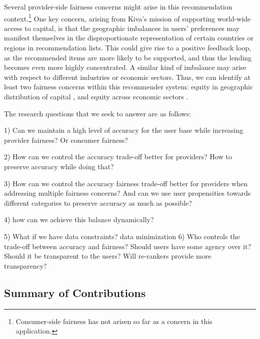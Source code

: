 Several provider-side fairness concerns might arise in this recommendation context.\footnote{Consumer-side fairness has not arisen so far as a concern in this application.} One key concern, arising from Kiva's mission of supporting world-wide access to capital, is that the geographic imbalances in users' preferences may manifest themselves in the disproportionate representation of certain countries or regions in recommendation lists. This could give rise to a positive feedback loop, as the recommended items are more likely to be supported, and thus the lending becomes even more highly concentrated. A similar kind of imbalance may arise with respect to different industries or economic sectors. Thus, we can identify at least two fairness concerns within this recommender system: equity in geographic distribution of capital \cite{liu2019personalized}, and equity across economic sectors
\cite{sonboli2020opportunistic}.



The research questions that we seek to answer are as follows:

1) Can we maintain a high level of accuracy for the user base while increasing provider fairness? Or consumer fairness?

2) How can we control the accuracy trade-off better for providers? How to preserve accuracy while doing that? 

3) How can we control the accuracy fairness trade-off better for providers when addressing multiple fairness concerns? And can we use user propensities towards different categories to preserve accuracy as much as possible?

4) how can we achieve this balance dynamically?

5) What if we have data constraints? data minimization
6) Who controls the trade-off between accuracy and fairness? Should users have some agency over it? Should it be transparent to the users? Will re-rankers provide more transparency?






\subsection{Summary of Contributions}

